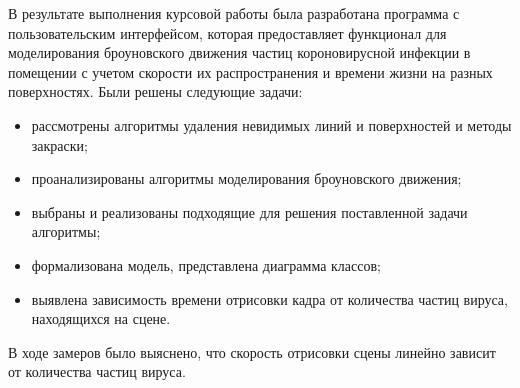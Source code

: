 \Conclusion %

В результате выполнения курсовой работы была разработана программа с пользовательским интерфейсом, которая предоставляет функционал для моделирования броуновского движения частиц короновирусной инфекции в помещении с учетом скорости их распространения и времени жизни на разных поверхностях.
Были решены следующие задачи:
\begin{itemize}
	\item рассмотрены алгоритмы удаления невидимых линий и поверхностей и методы закраски;
	\item проанализированы алгоритмы моделирования броуновского движения;
	\item выбраны и реализованы подходящие для решения поставленной задачи алгоритмы;
	\item формализована модель, представлена диаграмма классов;
	\item выявлена зависимость времени отрисовки кадра от количества частиц вируса, находящихся на сцене.
\end{itemize}

В ходе замеров было выяснено, что скорость отрисовки сцены линейно зависит от количества частиц вируса.